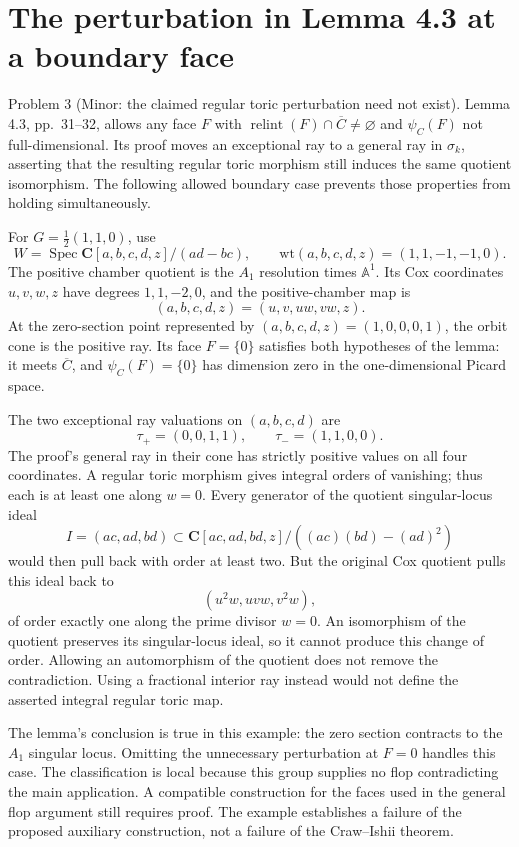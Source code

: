 \documentclass[10pt]{article}
\begin{document}
\section*{The perturbation in Lemma 4.3 at a boundary face}
Problem 3 (Minor: the claimed regular toric perturbation need not exist).  Lemma 4.3, pp. 31–32, allows any face \(F\) with \(\operatorname{relint}(F)\cap\overline C\ne\varnothing\) and \(\psi_C(F)\) not full-dimensional. Its proof moves an exceptional ray to a general ray in \(\sigma_k\), asserting that the resulting regular toric morphism still induces the same quotient isomorphism. The following allowed boundary case prevents those properties from holding simultaneously.\par
For \(G=\frac12(1,1,0)\), use \[W=\operatorname{Spec}\mathbf C[a,b,c,d,z]/(ad-bc),
 \qquad \mathrm{wt}(a,b,c,d,z)=(1,1,-1,-1,0).\] The positive chamber quotient is the \(A_1\) resolution times \(\mathbb A^1\). Its Cox coordinates \(u,v,w,z\) have degrees \(1,1,-2,0\), and the positive-chamber map is \[(a,b,c,d,z)=(u,v,uw,vw,z).\] At the zero-section point represented by \((a,b,c,d,z)=(1,0,0,0,1)\), the orbit cone is the positive ray. Its face \(F=\{0\}\) satisfies both hypotheses of the lemma: it meets \(\overline C\), and \(\psi_C(F)=\{0\}\) has dimension zero in the one-dimensional Picard space.\par
The two exceptional ray valuations on \((a,b,c,d)\) are \[\tau_+=(0,0,1,1),\qquad \tau_-=(1,1,0,0).\] The proof’s general ray in their cone has strictly positive values on all four coordinates. A regular toric morphism gives integral orders of vanishing; thus each is at least one along \(w=0\). Every generator of the quotient singular-locus ideal \[I=(ac,ad,bd)\subset
 \mathbf C[ac,ad,bd,z]/((ac)(bd)-(ad)^2)\] would then pull back with order at least two. But the original Cox quotient pulls this ideal back to \[(u^2w,uvw,v^2w),\] of order exactly one along the prime divisor \(w=0\). An isomorphism of the quotient preserves its singular-locus ideal, so it cannot produce this change of order. Allowing an automorphism of the quotient does not remove the contradiction. Using a fractional interior ray instead would not define the asserted integral regular toric map.\par
The lemma’s conclusion is true in this example: the zero section contracts to the \(A_1\) singular locus. Omitting the unnecessary perturbation at \(F=0\) handles this case. The classification is local because this group supplies no flop contradicting the main application. A compatible construction for the faces used in the general flop argument still requires proof. The example establishes a failure of the proposed auxiliary construction, not a failure of the Craw–Ishii theorem.\par
\end{document}
